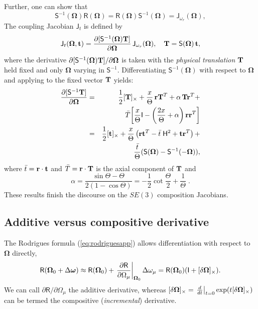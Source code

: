 \documentclass[journal]{IEEEtran}
\newcommand{\bfomega}{\boldsymbol{\omega}}
\newcommand{\bfOmega}{\boldsymbol{\Omega}}
\newcommand{\beq}{\begin{equation}}
\newcommand{\eeq}{\end{equation}}
\begin{document}
Further, one can show that
\beq
    \mathsf{S}^{-1}(\bfOmega)\mathsf{R}(\bfOmega) = \mathsf{R}(\bfOmega)\mathsf{S}^{-1}(\bfOmega) =
    \mathsf{J}_{\omega_r}(\bfOmega),
    \label{eq:SinvRidentity}
\eeq
The coupling Jacobian $\mathsf{J}_{t}$ is defined by
\beq
    \mathsf{J}_{t}(\bfOmega,{\bf t}) = {\partial [\mathsf{S}^{-1}(\bfOmega){\bf T}] \over
    \partial \bfOmega} \, \mathsf{J}_{\omega_r}(\bfOmega),\quad {\bf T} = \mathsf{S}(\bfOmega) \, {\bf t},
    \label{eq:couplingJacobian}
\eeq
where the derivative $\partial[\mathsf{S}^{-1}(\bfOmega){\bf T}]/\partial\bfOmega$
is taken with the \emph{physical translation} ${\bf T}$ held fixed
and only $\bfOmega$ varying in $\mathsf{S}^{-1}$.
Differentiating $\mathsf{S}^{-1}(\bfOmega)$ with respect to $\bfOmega$
and applying to the fixed vector ${\bf T}$ yields:
\begin{eqnarray}
    \frac{\partial[\mathsf{S}^{-1}{\bf T}]}{\partial\bfOmega} &=&
    \frac{1}{2}[{\bf T}]_\times + \frac{x}{\Theta}\,{\bf r}{\bf T}^T
    + \alpha\,{\bf T}{\bf r}^T + \nonumber\\
    && \bar T\!\left[\frac{x}{\Theta}\mathsf{I}
    - \left(\frac{2x}{\Theta}+\alpha\right){\bf r}{\bf r}^T\right] \nonumber\\
    &=& {1\over 2}[{\bf t}]_\times+ {x\over\Theta}
    \left( {\bf r}{\bf t}^T- {\bar t} \;\mathsf{H}^2 + {\bf t}{\bf r}^T \right) + \nonumber \\
    && {{\bar t}\over\Theta} (\mathsf{S}(\bfOmega)-\mathsf{S}^{-1}(-\bfOmega)),
    \label{eq:dSinvTdOmega}
\end{eqnarray}
where $\bar t = {\bf r}\cdot{\bf t}$ and $\bar T = {\bf r}\cdot{\bf T}$ is the axial component
of ${\bf T}$ and
\beq
    \alpha = \frac{\sin\Theta - \Theta}{2(1-\cos\Theta)}
    = -\frac{1}{2}\cot\frac{\Theta}{2} + \frac{1}{\Theta}\;.
    \label{eq:alphadef}
\eeq
These results finish the discourse on the $SE(3)$ composition Jacobians.

\subsection{Additive versus compositive derivative}
\label{app:addvscomp}
The Rodrigues formula (\ref{eq:rodriguesapp}) allows differentiation with respect to $\bfOmega$ directly,
\beq
    \mathsf{R}(\bfOmega_0+\Delta\bfomega) \approx 
    \mathsf{R}(\bfOmega_0) + \left. {\partial\mathsf{R}\over \partial\Omega_\mu} \right|_{\bfOmega_0}
    \Delta\omega_\mu = \mathsf{R}(\bfOmega_0) ( \mathsf{I} + [\delta\bfOmega]_\times ).
    \label{eq:rodriguesder}
\eeq
We can call $\partial\mathsf{R}/ \partial\Omega_\mu$ the additive derivative, whereas 
$[\delta\bfOmega]_\times = \left.{d\over dt}\right|_{t=0} \exp( t [\delta\bfOmega]_\times )$
can be termed the compositive ({\em incremental}) derivative.
\end{document}
